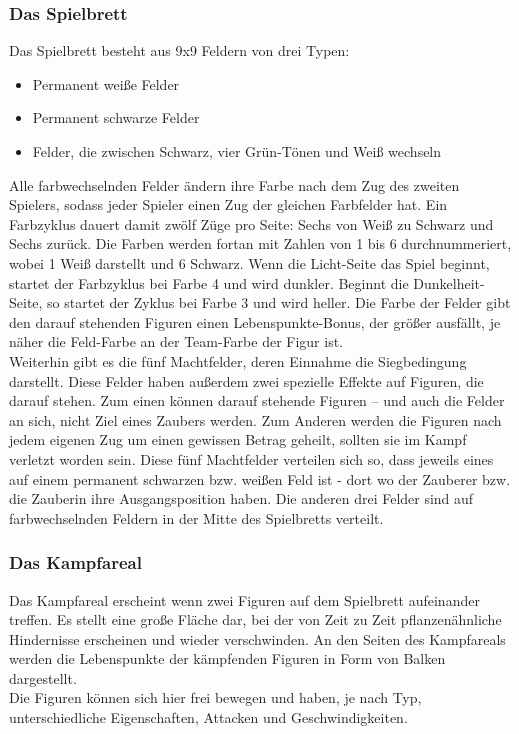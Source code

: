 \subsubsection{Das Spielbrett}
Das Spielbrett besteht aus 9x9 Feldern von drei Typen: 
\begin{itemize}
	\item Permanent weiße Felder
	\item Permanent schwarze Felder
	\item Felder, die zwischen Schwarz, vier Grün-Tönen und Weiß wechseln
\end{itemize}
Alle farbwechselnden Felder ändern ihre Farbe nach dem Zug des zweiten Spielers, sodass jeder Spieler einen Zug der gleichen Farbfelder hat. Ein Farbzyklus dauert damit zwölf Züge pro Seite: Sechs von Weiß zu Schwarz und Sechs zurück.
Die Farben werden fortan mit Zahlen von 1 bis 6 durchnummeriert, wobei 1 Weiß darstellt und 6 Schwarz.
Wenn die Licht-Seite das Spiel beginnt, startet der Farbzyklus bei Farbe 4 und wird dunkler. Beginnt die Dunkelheit-Seite, so startet der Zyklus bei Farbe 3 und wird heller. Die Farbe der Felder gibt den darauf stehenden Figuren einen Lebenspunkte-Bonus, der größer ausfällt, je näher die Feld-Farbe an der Team-Farbe der Figur ist.\\
Weiterhin gibt es die fünf Machtfelder, deren Einnahme die Siegbedingung darstellt. Diese Felder haben außerdem zwei spezielle Effekte auf Figuren, die darauf stehen. Zum einen können darauf stehende Figuren -- und auch die Felder an sich, nicht Ziel eines Zaubers werden. Zum Anderen werden die Figuren nach jedem eigenen Zug um einen gewissen Betrag geheilt, sollten sie im Kampf verletzt worden sein. Diese fünf Machtfelder verteilen sich so, dass jeweils eines auf einem permanent schwarzen bzw. weißen Feld ist - dort wo der Zauberer bzw. die Zauberin ihre Ausgangsposition haben. Die anderen drei Felder sind auf farbwechselnden Feldern in der Mitte des Spielbretts verteilt.

\subsubsection{Das Kampfareal}
Das Kampfareal erscheint wenn zwei Figuren auf dem Spielbrett aufeinander treffen. Es stellt eine große Fläche dar, bei der von Zeit zu Zeit pflanzenähnliche Hindernisse erscheinen und wieder verschwinden. An den Seiten des Kampfareals werden die Lebenspunkte der kämpfenden Figuren in Form von Balken dargestellt. \\
Die Figuren können sich hier frei bewegen und haben, je nach Typ, unterschiedliche Eigenschaften, Attacken und Geschwindigkeiten.


